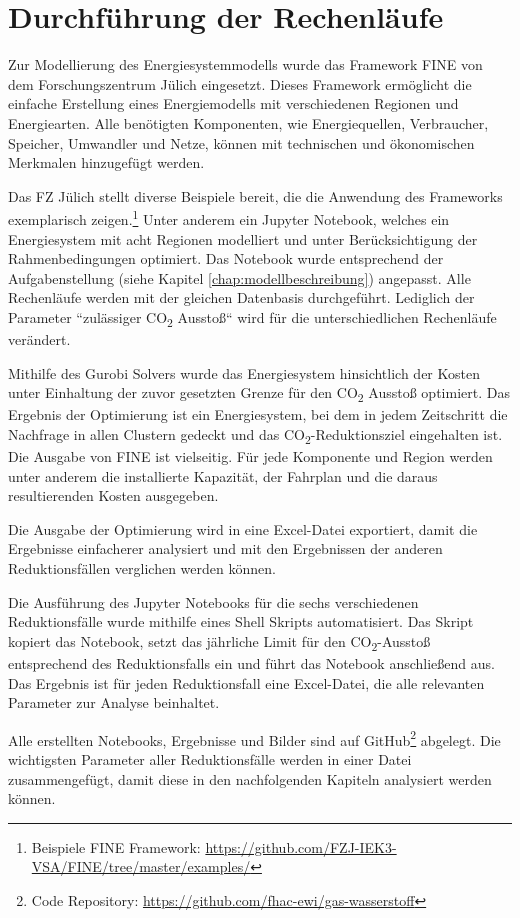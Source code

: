 \section{Durchführung der Rechenläufe}
Zur Modellierung des Energiesystemmodells wurde das Framework FINE von dem Forschungszentrum Jülich eingesetzt.
Dieses Framework ermöglicht die einfache Erstellung eines Energiemodells mit verschiedenen Regionen und Energiearten. Alle benötigten Komponenten, wie Energiequellen, Verbraucher, Speicher, Umwandler und Netze, können mit technischen und ökonomischen Merkmalen hinzugefügt werden. 

Das FZ Jülich stellt diverse Beispiele bereit, die die Anwendung des Frameworks exemplarisch zeigen.\footnote{Beispiele FINE Framework: \url{https://github.com/FZJ-IEK3-VSA/FINE/tree/master/examples/}} Unter anderem ein Jupyter Notebook, welches ein Energiesystem mit acht Regionen modelliert und unter Berücksichtigung der Rahmenbedingungen optimiert. Das Notebook wurde entsprechend der Aufgabenstellung (siehe Kapitel \ref{chap:modellbeschreibung}) angepasst. Alle Rechenläufe werden mit der gleichen Datenbasis durchgeführt. Lediglich der Parameter ``zulässiger CO\textsubscript{2}  Ausstoß`` wird für die unterschiedlichen Rechenläufe verändert. 

Mithilfe des Gurobi Solvers wurde das Energiesystem hinsichtlich der Kosten unter Einhaltung der zuvor gesetzten Grenze für den CO\textsubscript{2}  Ausstoß optimiert. Das Ergebnis der Optimierung ist ein Energiesystem, bei dem in jedem Zeitschritt die Nachfrage in allen Clustern gedeckt und das CO\textsubscript{2}-Reduktionsziel eingehalten ist. Die Ausgabe von FINE ist vielseitig. Für jede Komponente und Region werden unter anderem die installierte Kapazität, der Fahrplan und die daraus resultierenden Kosten ausgegeben.

Die Ausgabe der Optimierung wird in eine Excel-Datei exportiert, damit die Ergebnisse einfacherer analysiert und mit den Ergebnissen der anderen Reduktionsfällen verglichen werden können. 

Die Ausführung des Jupyter Notebooks für die sechs verschiedenen Reduktionsfälle wurde mithilfe eines Shell Skripts automatisiert. Das Skript kopiert das Notebook, setzt das jährliche Limit für den CO\textsubscript{2}-Ausstoß entsprechend des Reduktionsfalls ein und führt das Notebook anschließend aus. Das Ergebnis ist für jeden Reduktionsfall eine Excel-Datei, die alle relevanten Parameter zur Analyse beinhaltet.

Alle erstellten Notebooks, Ergebnisse und Bilder sind auf GitHub\footnote{Code Repository: \url{https://github.com/fhac-ewi/gas-wasserstoff}} abgelegt.  
Die wichtigsten Parameter aller Reduktionsfälle werden in einer Datei zusammengefügt, damit diese in den nachfolgenden Kapiteln analysiert werden können. 
